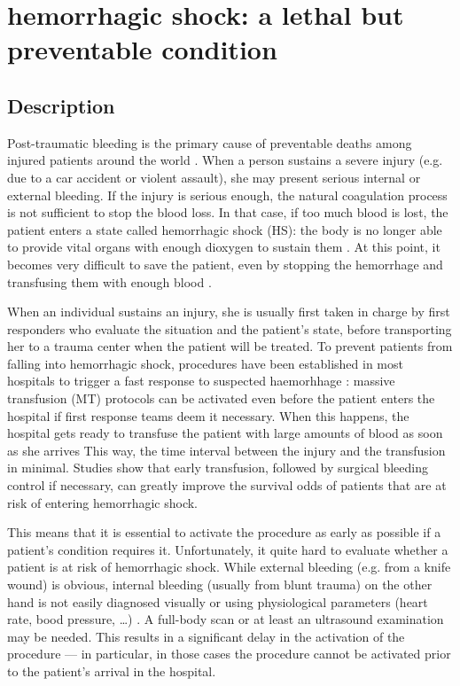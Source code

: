	\section{hemorrhagic shock: a lethal but preventable condition}
	\label{shock}
		\subsection{Description}
Post-traumatic bleeding is the primary cause of preventable deaths among injured patients around the world \cite{WHO}\cite{urban}. When a person sustains a severe injury (e.g. due to a car accident or violent assault), she may present serious internal or external bleeding. If the injury is serious enough, the natural coagulation process is not sufficient to stop the blood loss. In that case, if too much blood is lost, the patient enters a state called hemorrhagic shock (HS): the body is no longer able to provide vital organs with enough dioxygen to sustain them \cite{HS_def}. At this point, it becomes very difficult to save the patient, even by stopping the hemorrhage and transfusing them with enough blood \cite{??}.

When an individual sustains an injury, she is usually first taken in charge by first responders who evaluate the situation and the patient's state, before transporting her to a trauma center when the patient will be treated.
To prevent patients from falling into hemorrhagic shock, procedures have been established in most hospitals to trigger a fast response to suspected haemorhhage \cite{gestalt}: massive transfusion (MT) protocols can be activated even before the patient enters the hospital if first response teams deem it necessary. When this happens, the hospital gets ready to transfuse the patient with large amounts of blood as soon as she arrives This way, the time interval between the injury and the transfusion in minimal. Studies \cite{death_in_the_operating_room} \cite{modern_combat_support} show that early transfusion, followed by surgical bleeding control if necessary, can greatly improve the survival odds of patients that are at risk of entering hemorrhagic shock.

This means that it is essential to activate the procedure as early as possible if a patient's condition requires it. Unfortunately, it quite hard to evaluate whether a patient is at risk of hemorrhagic shock. While external bleeding (e.g. from a knife wound) is obvious, internal bleeding (usually from blunt trauma) on the other hand is not easily diagnosed visually or using physiological parameters (heart rate, bood pressure, \ldots) \cite{estimation_of_blood_loss}. A full-body scan or at least an ultrasound examination \cite{FAST?} may be needed. This results in a significant delay in the activation of the procedure --- in particular, in those cases the procedure cannot be activated prior to the patient's arrival in the hospital.

